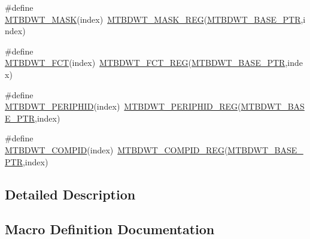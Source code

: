 \begin{DoxyCompactItemize}
\item 
\#define \hyperlink{group___m_t_b_d_w_t___register___accessor___macros_ga50843befc894854f828928abd04d8efa}{M\+T\+B\+D\+W\+T\+\_\+\+M\+A\+SK}(index)~\hyperlink{group___m_t_b_d_w_t___register___accessor___macros_ga32be33e09a6c10c58485d2beefb6facf}{M\+T\+B\+D\+W\+T\+\_\+\+M\+A\+S\+K\+\_\+\+R\+EG}(\hyperlink{group___m_t_b_d_w_t___peripheral_ga97d048bfb5a11293a38c444b8347ff42}{M\+T\+B\+D\+W\+T\+\_\+\+B\+A\+S\+E\+\_\+\+P\+TR},index)
\item 
\#define \hyperlink{group___m_t_b_d_w_t___register___accessor___macros_ga298082c69f94527d1e20a31e425f0008}{M\+T\+B\+D\+W\+T\+\_\+\+F\+CT}(index)~\hyperlink{group___m_t_b_d_w_t___register___accessor___macros_ga6bb0978c19eed749885efdb3c899edab}{M\+T\+B\+D\+W\+T\+\_\+\+F\+C\+T\+\_\+\+R\+EG}(\hyperlink{group___m_t_b_d_w_t___peripheral_ga97d048bfb5a11293a38c444b8347ff42}{M\+T\+B\+D\+W\+T\+\_\+\+B\+A\+S\+E\+\_\+\+P\+TR},index)
\item 
\#define \hyperlink{group___m_t_b_d_w_t___register___accessor___macros_ga8539caea63d1d42dee52ab3ffd2f9e76}{M\+T\+B\+D\+W\+T\+\_\+\+P\+E\+R\+I\+P\+H\+ID}(index)~\hyperlink{group___m_t_b_d_w_t___register___accessor___macros_ga91f7c6dfb35fc0d26fb6b3fae63757fc}{M\+T\+B\+D\+W\+T\+\_\+\+P\+E\+R\+I\+P\+H\+I\+D\+\_\+\+R\+EG}(\hyperlink{group___m_t_b_d_w_t___peripheral_ga97d048bfb5a11293a38c444b8347ff42}{M\+T\+B\+D\+W\+T\+\_\+\+B\+A\+S\+E\+\_\+\+P\+TR},index)
\item 
\#define \hyperlink{group___m_t_b_d_w_t___register___accessor___macros_ga33c7aa399974b7371ca1fa780b9d1d62}{M\+T\+B\+D\+W\+T\+\_\+\+C\+O\+M\+P\+ID}(index)~\hyperlink{group___m_t_b_d_w_t___register___accessor___macros_gaaeee0c6c32b2caddaf8ec3a96b430de0}{M\+T\+B\+D\+W\+T\+\_\+\+C\+O\+M\+P\+I\+D\+\_\+\+R\+EG}(\hyperlink{group___m_t_b_d_w_t___peripheral_ga97d048bfb5a11293a38c444b8347ff42}{M\+T\+B\+D\+W\+T\+\_\+\+B\+A\+S\+E\+\_\+\+P\+TR},index)
\end{DoxyCompactItemize}


\subsection{Detailed Description}


\subsection{Macro Definition Documentation}
\mbox{\label{group___m_t_b_d_w_t___register___accessor___macros_ga66a9e86272e57446b4e31c0cdf57c400}} 
